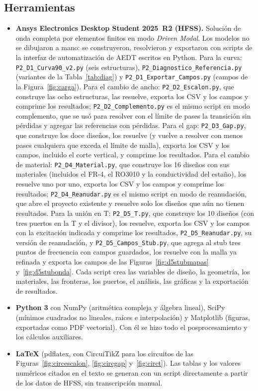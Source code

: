 \documentclass[11pt,letterpaper]{article}
\begin{document}
\subsection{Herramientas}
\begin{itemize}
\item \textbf{Ansys Electronics Desktop Student 2025~R2 (HFSS).} Solución de onda completa por elementos finitos en modo \emph{Driven Modal}. Los modelos no se dibujaron a mano: se construyeron, resolvieron y exportaron con scripts de la interfaz de automatización de AEDT escritos en Python. Para la curva: \texttt{P2\_D1\_Curva90\_v2.py} (seis estructuras), \texttt{P2\_Diagnostico\_Referencia.py} (variantes de la Tabla~\ref{tab:diag}) y \texttt{P2\_D1\_Exportar\_Campos.py} (campos de la Figura~\ref{fig:carga}). Para el cambio de ancho: \texttt{P2\_D2\_Escalon.py}, que construye las ocho estructuras, las resuelve, exporta los CSV y los campos y comprime los resultados; \texttt{P2\_D2\_Complemento.py} es el mismo script en modo complemento, que se usó para resolver con el límite de pases la transición sin pérdidas y agregar las referencias con pérdidas. Para el gap: \texttt{P2\_D3\_Gap.py}, que construye los doce diseños, los resuelve (y vuelve a resolver con menos pases cualquiera que exceda el límite de malla), exporta los CSV y los campos, incluido el corte vertical, y comprime los resultados. Para el cambio de material: \texttt{P2\_D4\_Material.py}, que construye los 16 diseños con sus materiales (incluidos el FR-4, el RO3010 y la conductividad del estaño), los resuelve uno por uno, exporta los CSV y los campos y comprime los resultados; \texttt{P2\_D4\_Reanudar.py} es el mismo script en modo de reanudación, que abre el proyecto existente y resuelve solo los diseños que aún no tienen resultados. Para la unión en T: \texttt{P2\_D5\_T.py}, que construye los 10 diseños (con tres puertos en la T y el divisor), los resuelve, exporta los CSV y los campos con la excitación indicada y comprime los resultados, \texttt{P2\_D5\_Reanudar.py}, su versión de reanudación, y \texttt{P2\_D5\_Campos\_Stub.py}, que agrega al stub tres puntos de frecuencia con campos guardados, los resuelve con la malla ya refinada y exporta los campos de las Figuras~\ref{fig:d5stubmapas} y~\ref{fig:d5stubonda}. Cada script crea las variables de diseño, la geometría, los materiales, las fronteras, los puertos, el análisis, las gráficas y la exportación de resultados.
\item \textbf{Python 3} con NumPy (aritmética compleja y álgebra lineal), SciPy (mínimos cuadrados no lineales, raíces e interpolación) y Matplotlib (figuras, exportadas como PDF vectorial). Con él se hizo todo el posprocesamiento y los cálculos auxiliares.
\item \textbf{\LaTeX} (pdflatex, con CircuiTikZ para los circuitos de las Figuras~\ref{fig:circescalon}, \ref{fig:circgap} y~\ref{fig:circt}). Las tablas y los valores numéricos citados en el texto se generan con un script directamente a partir de los datos de HFSS, sin transcripción manual.
\end{itemize}
\end{document}
